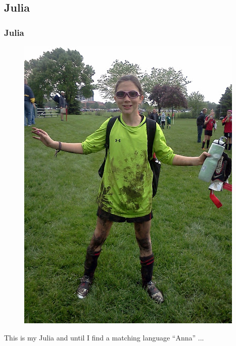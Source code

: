 \documentclass[dvipsnames,compress,pdflatex,beamer]{beamer}
\begin{document}
\subsection{Julia}
\begin{frame}
  \frametitle{Julia}
  \pause

  \begin{figure}
    \includegraphics[scale=0.3]{images/JEasGoalie.jpeg}
  \end{figure}

  \medskip

  This is my Julia and until I find a matching language ``Anna'' ...

\end{frame}


\end{document}
